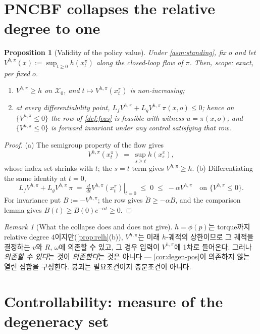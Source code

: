 \documentclass[11pt]{article}
\theoremstyle{plain}
\newtheorem{proposition}[theorem]{Proposition}
\theoremstyle{definition}
\theoremstyle{remark}
\newtheorem{remark}[theorem]{Remark}
\newcommand{\calX}{\mathcal{X}}
\newcommand{\Vhp}[1]{V^{h,#1}}
\newcommand{\Vhpi}{\Vhp{\pi}}
\newcommand{\Lg}{L_g}
\newcommand{\Lf}{L_f}
\newcommand{\eqdef}{:=}
\begin{document}
\section{PNCBF collapses the relative degree to one}\label{sec:validity}

\begin{proposition}[Validity of the policy value]\label{prop:validity}
Under \cref{asm:standing}, fix $o$ and let $\Vhpi(x)\eqdef\sup_{t\ge0}h(x_t^\pi)$ along the
closed-loop flow of $\pi$. Then, scope: exact, per fixed $o$.
\begin{enumerate}[label=(\alph*)]
  \item $\Vhpi\ge h$ on $\calX_0$, and $t\mapsto\Vhpi(x_t^\pi)$ is non-increasing;
  \item at every differentiability point, $\Lf\Vhpi+\Lg\Vhpi\,\pi(x,o)\le0$; hence on
  $\{\Vhpi\le0\}$ the row of \cref{def:feas} is feasible with witness $u=\pi(x,o)$, and
  $\{\Vhpi\le0\}$ is forward invariant under any control satisfying that row.
\end{enumerate}
\end{proposition}

\begin{proof}
(a) The semigroup property of the flow gives
\[
\Vhpi(x_t^\pi)\;=\;\sup_{s\ge t}h(x_s^\pi),
\]
whose index set shrinks with $t$; the $s=t$ term gives $\Vhpi\ge h$.
(b) Differentiating the same identity at $t=0$,
\[
\Lf\Vhpi+\Lg\Vhpi\,\pi\;=\;\left.\tfrac{d}{dt}\Vhpi(x_t^\pi)\right|_{t=0}\;\le\;0\;\le\;-\alpha\Vhpi
\quad\text{on }\{\Vhpi\le0\}.
\]
For invariance put $B\eqdef-\Vhpi$; the row gives $\dot B\ge-\alpha B$, and the comparison
lemma gives $B(t)\ge B(0)e^{-\alpha t}\ge0$.
\end{proof}

\begin{remark}[What the collapse does and does not give]\label{rem:collapse}
$h=\phi(p)$는 torque까지 relative degree $4$이지만(\cref{prop:relh}(b)), $\Vhpi$는 미래 $h$-궤적의
상한이므로 그 궤적을 결정하는 $v$와 $R$, $\omega$에 의존할 수 있고, 그 경우 입력이 $\Vhpi$에
1차로 들어온다. 그러나 \emph{의존할 수 있다}는 것이 \emph{의존한다}는 것은 아니다 ---
\cref{cor:degen-pos}이 의존하지 않는 열린 집합을 구성한다. 붕괴는 필요조건이지 충분조건이 아니다.
\end{remark}

\section{Controllability: measure of the degeneracy set}\label{sec:controllability}
\end{document}
